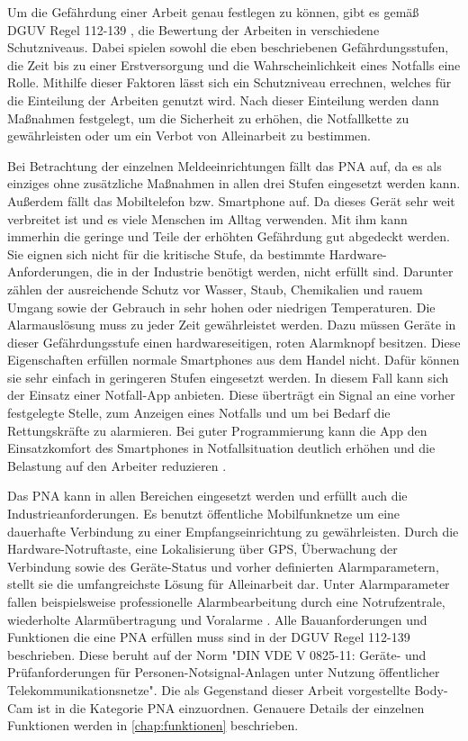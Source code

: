 \documentclass[thesis.tex]{subfiles}
\begin{document}
Um die Gefährdung einer Arbeit genau festlegen zu können, gibt es gemäß DGUV Regel 112-139 \cite[]{Regel_112-139}, die Bewertung der Arbeiten in verschiedene Schutzniveaus.
Dabei spielen sowohl die eben beschriebenen Gefährdungsstufen, die Zeit bis zu einer Erstversorgung und die Wahrscheinlichkeit eines Notfalls eine Rolle.
Mithilfe dieser Faktoren lässt sich ein Schutzniveau errechnen, welches für die Einteilung der Arbeiten genutzt wird.
Nach dieser Einteilung werden dann Maßnahmen festgelegt, um die Sicherheit zu erhöhen, die Notfallkette zu gewährleisten oder um ein Verbot von Alleinarbeit zu bestimmen.

Bei Betrachtung der einzelnen Meldeeinrichtungen fällt das PNA auf, da es als einziges ohne zusätzliche Maßnahmen in allen drei Stufen eingesetzt werden kann.
Außerdem fällt das Mobiltelefon bzw. Smartphone auf.
Da dieses Gerät sehr weit verbreitet ist und es viele Menschen im Alltag verwenden.
Mit ihm kann immerhin die geringe und Teile der erhöhten Gefährdung gut abgedeckt werden.
Sie eignen sich nicht für die kritische Stufe, da bestimmte Hardware-Anforderungen, die in der Industrie benötigt werden, nicht erfüllt sind.
Darunter zählen der ausreichende Schutz vor Wasser, Staub, Chemikalien und rauem Umgang sowie der Gebrauch in sehr hohen oder niedrigen Temperaturen.
Die Alarmauslösung muss zu jeder Zeit gewährleistet werden.
Dazu müssen Geräte in dieser Gefährdungsstufe einen hardwareseitigen, roten Alarmknopf besitzen.
Diese Eigenschaften erfüllen normale Smartphones aus dem Handel nicht.
Dafür können sie sehr einfach in geringeren Stufen eingesetzt werden.
In diesem Fall kann sich der Einsatz einer Notfall-App anbieten.
Diese überträgt ein Signal an eine vorher festgelegte Stelle, zum Anzeigen eines Notfalls und um bei Bedarf die Rettungskräfte zu alarmieren.
Bei guter Programmierung kann die App den Einsatzkomfort des Smartphones in Notfallsituation deutlich erhöhen und die Belastung auf den Arbeiter reduzieren \cite[vgl. S.2-5]{FAQ-PNAuAPP}.

Das PNA kann in allen Bereichen eingesetzt werden und erfüllt auch die Industrieanforderungen.
Es benutzt öffentliche Mobilfunknetze um eine dauerhafte Verbindung zu einer Empfangseinrichtung zu gewährleisten.
Durch die Hardware-Notruftaste, eine Lokalisierung über GPS, Überwachung der Verbindung sowie des Geräte-Status und vorher definierten Alarmparametern, stellt sie die umfangreichste Lösung für Alleinarbeit dar.
Unter Alarmparameter fallen beispielsweise professionelle Alarmbearbeitung durch eine Notrufzentrale, wiederholte Alarmübertragung und Voralarme \cite[vgl. S.2-5]{FAQ-PNAuAPP}.
Alle Bauanforderungen und Funktionen die eine PNA erfüllen muss sind in der DGUV Regel 112-139 \cite[]{Regel_112-139} beschrieben.
Diese beruht auf der Norm "DIN VDE V 0825-11: Geräte- und Prüfanforderungen für Personen-Notsignal-Anlagen unter Nutzung öffentlicher Telekommunikationsnetze".
Die als Gegenstand dieser Arbeit vorgestellte Body-Cam ist in die Kategorie PNA einzuordnen.
Genauere Details der einzelnen Funktionen werden in \autoref{chap:funktionen} beschrieben.
\end{document}
